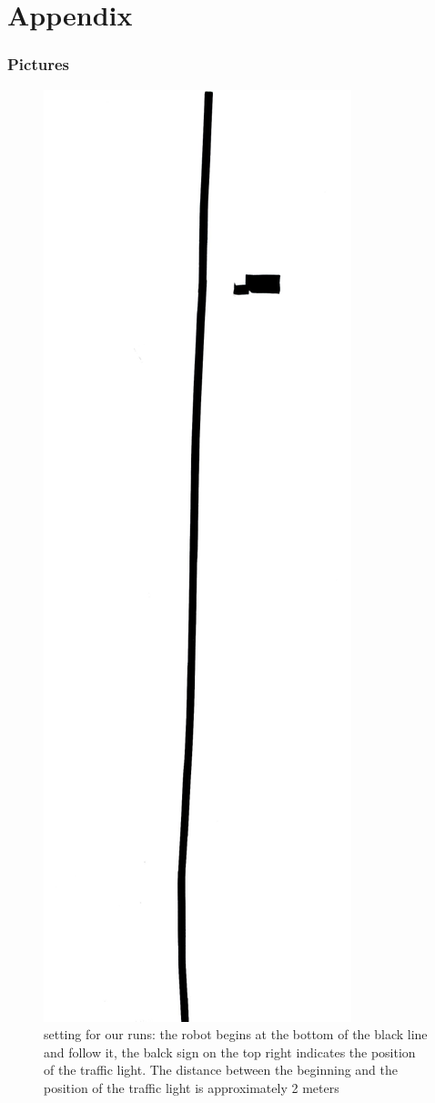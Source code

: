 \documentclass[14pt,a4paper]{article}
\let\oldpart\part
\renewcommand\part{\newpage\oldpart}
\theoremstyle{definition}
\begin{document}
\newpage
\part{Appendix}
\appendix
\section{Pictures} \label{pictures}

\begin{figure}[h]
\centering
\captionsetup{justification=centering,margin=2cm}
\includegraphics[scale=0.3]{img/setting.pdf}
\caption{setting for our runs: the robot begins at the bottom of the black line and follow it, the balck sign on the top right indicates the position of the traffic light. The distance between the beginning and the position of the traffic light is approximately 2 meters}
\label{setting}
\end{figure}
\end{document}
